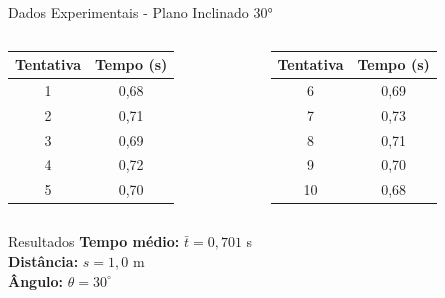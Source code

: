 \documentclass[12pt]{beamer}
\begin{document}
\begin{frame}{Dados Experimentais - Plano Inclinado 30°}
    \small
    \begin{columns}
        \begin{column}{0.5\textwidth}
            \begin{table}
                \centering
                \begin{tabular}{|c|c|}
                    \hline
                    \textbf{Tentativa} & \textbf{Tempo (s)} \\
                    \hline
                    1                  & 0,68               \\
                    2                  & 0,71               \\
                    3                  & 0,69               \\
                    4                  & 0,72               \\
                    5                  & 0,70               \\
                    \hline
                \end{tabular}
            \end{table}
        \end{column}
        \begin{column}{0.5\textwidth}
            \begin{table}
                \centering
                \begin{tabular}{|c|c|}
                    \hline
                    \textbf{Tentativa} & \textbf{Tempo (s)} \\
                    \hline
                    6                  & 0,69               \\
                    7                  & 0,73               \\
                    8                  & 0,71               \\
                    9                  & 0,70               \\
                    10                 & 0,68               \\
                    \hline
                \end{tabular}
            \end{table}
        \end{column}
    \end{columns}

    \vspace{0.3cm}
    \begin{block}{Resultados}
        \centering
        \textbf{Tempo médio:} $\bar{t} = 0,701$ s \\
        \textbf{Distância:} $s = 1,0$ m \\
        \textbf{Ângulo:} $\theta = 30^\circ$
    \end{block}
\end{frame}
\end{document}
